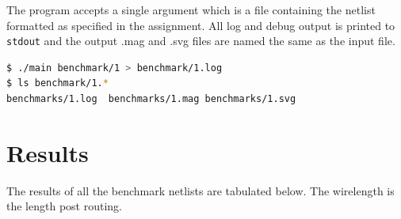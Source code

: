 \documentclass[10pt]{article}
\begin{document}
The program accepts a single argument which is a file containing the netlist
formatted as specified in the assignment. All log and debug output is printed
to \texttt{stdout} and the output .mag and .svg files are named the same as the
input file.

\begin{lstlisting}[language=bash]
$ ./main benchmark/1 > benchmark/1.log
$ ls benchmark/1.*
benchmarks/1.log  benchmarks/1.mag benchmarks/1.svg
\end{lstlisting}

\section{Results}

    The results of all the benchmark netlists are tabulated below. The
    wirelength is the length post routing.
\end{document}
